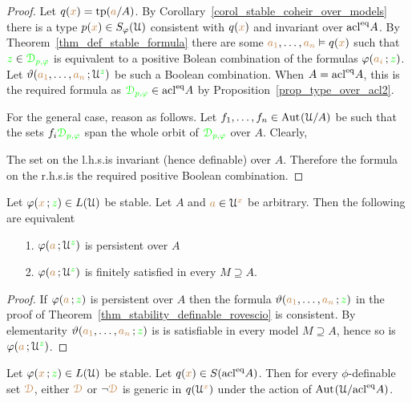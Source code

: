 \begin{proof}
  Let $q({\color{brown} x})={\rm tp}({\color{brown} a}/A)$.
  By Corollary~\ref{corol_stable_coheir_over_models} there is a type $p({\color{brown} x})\in S_\varphi(\EuScript U)$ consistent with $q({\color{brown} x})$ and invariant over $\mathop{\rm acl}^{{\rm eq}}\!A$.
  By Theorem~\ref{thm_def_stable_formula} there are some ${\color{brown} a_1},\dots,{\color{brown} a_n}\vDash q({\color{brown} x})$ such that ${\color{green} z}\in{\color{green}\EuScript D_{p,\varphi}}$ is equivalent to a positive Bolean combination of the formulas $\varphi({\color{brown} a_i}\,;{\color{green} z})$.
  Let $\vartheta({\color{brown} a_1},\dots,{\color{brown} a_n}\,;\EuScript U^{\color{green} z})$ be such a Boolean combination.
  When $A=\mathop{\rm acl}^{{\rm eq}}\!A$, this is the required formula as ${\color{green}\EuScript D_{p,\varphi}}\in\mathop{\rm acl}^{{\rm eq}}\!A$ by Proposition~\ref{prop_type_over_acl2}.

  For the general case, reason as follows.
  Let $f_1,\dots,f_n\in{\rm Aut\kern.15ex}(\EuScript U/A)$ be such that the sets $f_i{\color{green}\EuScript D_{p,\varphi}}$ span the whole orbit of ${\color{green}\EuScript D_{p,\varphi}}$ over $A$.
  Clearly,


  The set on the l.h.s.\@ is invariant (hence definable) over $A$.
  Therefore the formula on the r.h.s.\@ is the required positive Boolean combination.
\end{proof}

\begin{corollary}\label{corol_persistent_finsat}
  Let $\varphi({\color{brown} x}\,;{\color{green} z})\in L(\EuScript U)$ be stable.
  Let $A$ and ${\color{brown} a}\in\EuScript U^{\color{brown} x}$ be arbitrary.
  Then the following are equivalent
  \begin{itemize}
    \item[1.] $\varphi({\color{brown} a}\,;\EuScript U^{\color{green} z})$ is persistent over $A$
    \item[2.] $\varphi({\color{brown} a}\,;\EuScript U^{\color{green} z})$ is finitely satisfied in every $M\supseteq A$.
  \end{itemize}
\end{corollary}
\begin{proof}
  If $\varphi({\color{brown} a}\,;{\color{green} z})$ is persistent over $A$ then the formula $\vartheta({\color{brown} a_1},\dots,{\color{brown} a_n}\,;{\color{green} z})$ in the proof of Theorem~\ref{thm_stability_definable_rovescio} is consistent. By elementarity $\vartheta({\color{brown} a_1},\dots,{\color{brown} a_n}\,;{\color{green} z})$ is is satisfiable in every model $M\supseteq A$, hence so is $\varphi({\color{brown} a}\,;\EuScript U^{\color{green} z})$.
\end{proof}

\begin{corollary}\label{corol_stable_generic}
  Let $\varphi({\color{brown} x}\,;{\color{green} z})\in L(\EuScript U)$ be stable.
  Let $q({\color{brown} x})\in S(\mathop{\rm acl}^{{\rm eq}}\!A)$.
  Then for every $\phi$-definable set ${\color{brown}\EuScript D}$, either ${\color{brown}\EuScript D}$ or $\neg{\color{brown}\EuScript D}$ is generic in $q(\EuScript U^{\color{brown} x})$ under the action of ${\rm Aut\kern.15ex}(\EuScript U/\!\mathop{\rm acl}^{{\rm eq}}\!A)$.
\end{corollary}

